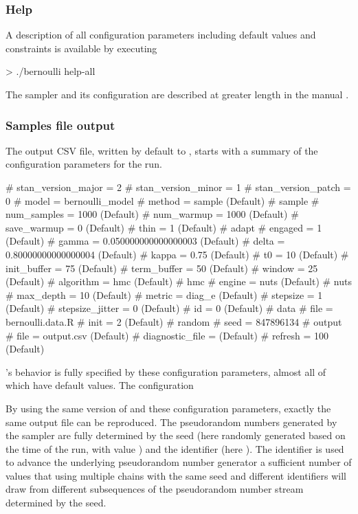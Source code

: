 \documentclass[article]{jss}
\begin{document}
\subsubsection{Help}

A description of all configuration parameters including default values
and constraints is available by executing
%
\begin{CodeChunk}
\begin{CodeInput}
> ./bernoulli help-all
\end{CodeInput}
\end{CodeChunk}
%
The sampler and its configuration are described at greater length in
the manual \citep{Stan:2013}.

\subsubsection{Samples file output}

The output CSV file, written by default to , starts
with a summary of the configuration parameters for the run.
%
\begin{Code}
# stan_version_major = 2
# stan_version_minor = 1
# stan_version_patch = 0
# model = bernoulli_model
# method = sample (Default)
#   sample
#     num_samples = 1000 (Default)
#     num_warmup = 1000 (Default)
#     save_warmup = 0 (Default)
#     thin = 1 (Default)
#     adapt
#       engaged = 1 (Default)
#       gamma = 0.050000000000000003 (Default)
#       delta = 0.80000000000000004 (Default)
#       kappa = 0.75 (Default)
#       t0 = 10 (Default)
#       init_buffer = 75 (Default)
#       term_buffer = 50 (Default)
#       window = 25 (Default)
#     algorithm = hmc (Default)
#       hmc
#         engine = nuts (Default)
#           nuts
#             max_depth = 10 (Default)
#         metric = diag_e (Default)
#         stepsize = 1 (Default)
#         stepsize_jitter = 0 (Default)
# id = 0 (Default)
# data
#   file = bernoulli.data.R
# init = 2 (Default)
# random
#   seed = 847896134
# output
#   file = output.csv (Default)
#   diagnostic_file =  (Default)
#   refresh = 100 (Default)
\end{Code}
%
's behavior is fully specified by these configuration
parameters, almost all of which have default values.  The
 configuration

 By using the same version of
 and these configuration parameters, exactly the same
output file can be reproduced.  The pseudorandom numbers generated by
the sampler are fully determined by the seed (here randomly generated
based on the time of the run, with value ) and the
identifier (here ).  The identifier is used to advance the
underlying pseudorandom number generator a sufficient number of values
that using multiple chains with the same seed and different
identifiers will draw from different subsequences of the pseudorandom
number stream determined by the seed.
\end{document}
